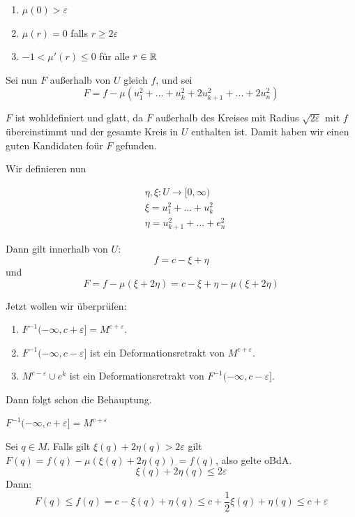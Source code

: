 \begin{bigproof}
    \begin{enumerate}
        \item $ \mu(0) > \varepsilon $
        \item $ \mu(r) = 0 $ falls $ r \geq 2 \varepsilon $
        \item $ -1 < \mu'(r) \leq 0 $ für alle $ r \in { \mathbb R } $
    \end{enumerate}

    Sei nun $F$ außerhalb von $U$ gleich $f$, und sei
    \[ F = f - \mu(u_1^2 + ... + u_k^2 + 2u_{k+1}^2 + ... + 2u_n^2) \]

    $F$ ist wohldefiniert und glatt, da $F$ außerhalb des Kreises mit Radius 
    $\sqrt{2\varepsilon}$ mit $f$ übereinstimmt und der gesamte Kreis in $U$ 
    enthalten ist. Damit haben wir einen guten Kandidaten foür $F$ gefunden.

    Wir definieren nun

    \begin{align*}
        & \eta, \xi: U \to [0, \infty) \\
        & \xi = u_1^2 + ... + u_k^2 \\
        & \eta = u_{k + 1}^2 + ... + e_n^2
    \end{align*}

    Dann gilt innerhalb von $U$:
    \[ f = c - \xi + \eta \]
    und 
    \[ F = f - \mu(\xi + 2 \eta) = c - \xi + \eta - \mu(\xi + 2 \eta) \]

    Jetzt wollen wir überprüfen:
    \begin{enumerate}
        \item $F^{-1}(-\infty, c + \varepsilon] = M^{c + \varepsilon}$.
        \item $F^{-1}(-\infty, c - \varepsilon]$ ist ein Deformationsretrakt von 
            $M^{c + \varepsilon}$.
        \item $M^{c - \varepsilon} \cup e^k$ ist ein Deformationsretrakt von
            $F^{-1}(-\infty, c - \varepsilon]$.
    \end{enumerate}

    Dann folgt schon die Behauptung.

    \begin{claim} 
        $F^{-1}(-\infty, c + \varepsilon] = M^{c + \varepsilon}$
    \end{claim}

    \begin{smallproof}
        Sei $q \in M$. Falls gilt $\xi(q) + 2 \eta(q) > 2 \varepsilon$ gilt 
        $F(q) = f(q) - \mu(\xi(q) + 2\eta(q)) = f(q)$,
        also gelte oBdA.
        \[ \xi(q) + 2 \eta(q) \leq 2 \varepsilon \]
        Dann:
        \[ F(q) \leq f(q) = c - \xi(q) + \eta(q) \leq c + \frac{1}{2}\xi(q) + \eta(q) \leq c + \varepsilon \]
    \end{smallproof}


\end{bigproof}
